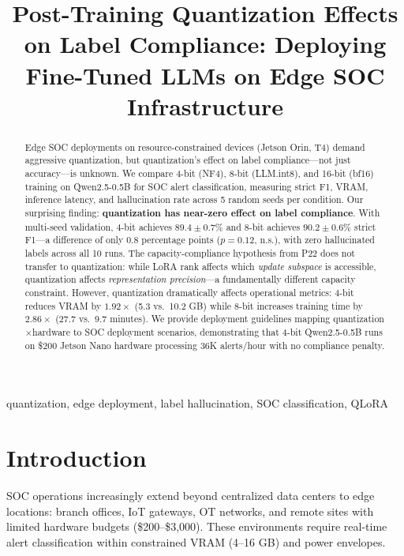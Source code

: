 \documentclass[journal]{IEEEtran}
\begin{document}
\title{Post-Training Quantization Effects on Label Compliance: Deploying Fine-Tuned LLMs on Edge SOC Infrastructure}
\author{}
\maketitle

\begin{abstract}
Edge SOC deployments on resource-constrained devices (Jetson Orin, T4) demand aggressive quantization, but quantization's effect on label compliance---not just accuracy---is unknown. We compare 4-bit (NF4), 8-bit (LLM.int8), and 16-bit (bf16) training on Qwen2.5-0.5B for SOC alert classification, measuring strict F1, VRAM, inference latency, and hallucination rate across 5 random seeds per condition. Our surprising finding: \textbf{quantization has near-zero effect on label compliance}. With multi-seed validation, 4-bit achieves $89.4 \pm 0.7$\% and 8-bit achieves $90.2 \pm 0.6$\% strict F1---a difference of only 0.8 percentage points ($p = 0.12$, n.s.), with zero hallucinated labels across all 10 runs. The capacity-compliance hypothesis from P22 does not transfer to quantization: while LoRA rank affects which \emph{update subspace} is accessible, quantization affects \emph{representation precision}---a fundamentally different capacity constraint. However, quantization dramatically affects operational metrics: 4-bit reduces VRAM by $1.92\times$ (5.3 vs.\ 10.2 GB) while 8-bit increases training time by $2.86\times$ (27.7 vs.\ 9.7 minutes). We provide deployment guidelines mapping quantization$\times$hardware to SOC deployment scenarios, demonstrating that 4-bit Qwen2.5-0.5B runs on \$200 Jetson Nano hardware processing 36K alerts/hour with no compliance penalty.
\end{abstract}
\begin{IEEEkeywords}
quantization, edge deployment, label hallucination, SOC classification, QLoRA
\end{IEEEkeywords}

\section{Introduction}
SOC operations increasingly extend beyond centralized data centers to edge locations: branch offices, IoT gateways, OT networks, and remote sites with limited hardware budgets (\$200--\$3,000). These environments require real-time alert classification within constrained VRAM (4--16 GB) and power envelopes.
\end{document}
